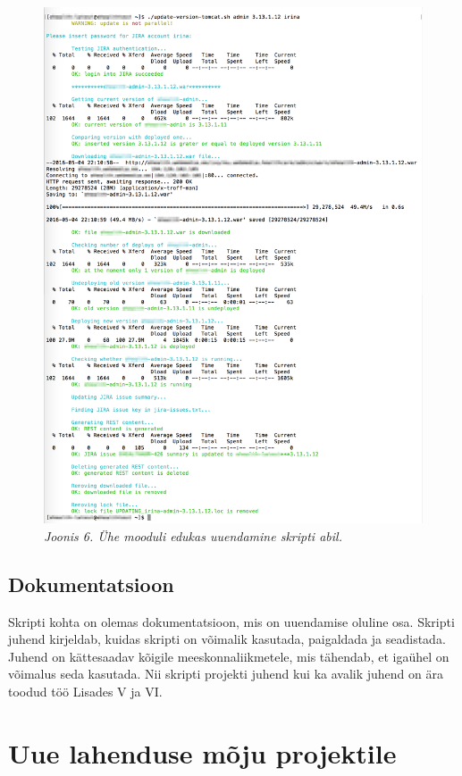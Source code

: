 \documentclass[12pt]{article}
\begin{document}
  \begin{figure}[H]
     \begin{center} 
       \includegraphics[width=.85\textwidth]{screenshots/one-module-successful-update.png}
       \caption*{\textit{Joonis 6. Ühe mooduli edukas uuendamine skripti abil.}}
     \end{center}
   \end{figure}

  \subsection{Dokumentatsioon}
  
  Skripti kohta on olemas dokumentatsioon, mis on uuendamise oluline osa. Skripti juhend kirjeldab, kuidas skripti on võimalik kasutada, paigaldada ja seadistada. Juhend on kättesaadav kõigile meeskonnaliikmetele, mis tähendab, et igaühel on võimalus seda kasutada. Nii skripti projekti juhend kui ka avalik juhend on ära toodud töö Lisades V ja VI.
  
  \newpage
  
  \section{Uue lahenduse mõju projektile}
  
\end{document}
